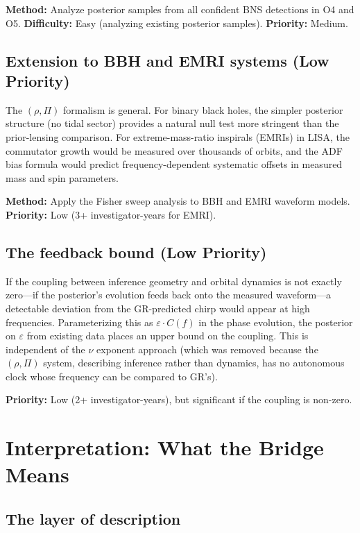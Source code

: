 \documentclass[twocolumn,prd,showpacs,superscriptaddress]{revtex4-2}
\begin{document}
\textbf{Method:} Analyze posterior samples from all confident BNS detections in O4 and O5. \textbf{Difficulty:} Easy (analyzing existing posterior samples). \textbf{Priority:} Medium.

\subsection{Extension to BBH and EMRI systems (Low Priority)}

The $(\rho, \Pi)$ formalism is general. For binary black holes, the simpler posterior structure (no tidal sector) provides a natural null test more stringent than the prior-lensing comparison. For extreme-mass-ratio inspirals (EMRIs) in LISA, the commutator growth would be measured over thousands of orbits, and the ADF bias formula would predict frequency-dependent systematic offsets in measured mass and spin parameters.

\textbf{Method:} Apply the Fisher sweep analysis to BBH and EMRI waveform models. \textbf{Priority:} Low (3+ investigator-years for EMRI).

\subsection{The feedback bound (Low Priority)}

If the coupling between inference geometry and orbital dynamics is not exactly zero---if the posterior's evolution feeds back onto the measured waveform---a detectable deviation from the GR-predicted chirp would appear at high frequencies. Parameterizing this as $\varepsilon \cdot C(f)$ in the phase evolution, the posterior on $\varepsilon$ from existing data places an upper bound on the coupling. This is independent of the $\nu$ exponent approach (which was removed because the $(\rho, \Pi)$ system, describing inference rather than dynamics, has no autonomous clock whose frequency can be compared to GR's).

\textbf{Priority:} Low (2+ investigator-years), but significant if the coupling is non-zero.

\section{Interpretation: What the Bridge Means}
\label{sec:interpretation}

\subsection{The layer of description}
\end{document}
